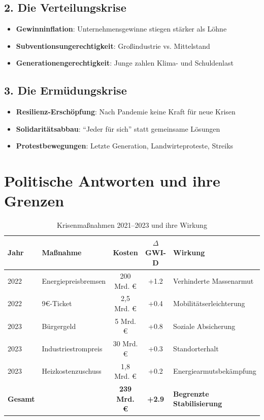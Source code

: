 \subsection{2. Die Verteilungskrise}

\begin{itemize}
    \item \textbf{Gewinninflation}: Unternehmensgewinne stiegen stärker als Löhne
    \item \textbf{Subventionsungerechtigkeit}: Großindustrie vs. Mittelstand
    \item \textbf{Generationengerechtigkeit}: Junge zahlen Klima- und Schuldenlast
\end{itemize}

\subsection{3. Die Ermüdungskrise}

\begin{itemize}
    \item \textbf{Resilienz-Erschöpfung}: Nach Pandemie keine Kraft für neue Krisen
    \item \textbf{Solidaritätsabbau}: \enquote{Jeder für sich} statt gemeinsame Lösungen
    \item \textbf{Protestbewegungen}: Letzte Generation, Landwirteproteste, Streiks
\end{itemize}

\section{Politische Antworten und ihre Grenzen}

\begin{table}[ht]
    \centering
    \caption{Krisenmaßnahmen 2021–2023 und ihre Wirkung}
    \label{tab:massnahmen_multikrise}
    \begin{tabular}{llccp{5cm}}
        \toprule
        \textbf{Jahr} & \textbf{Maßnahme} & \textbf{Kosten} & \textbf{$\Delta$ GWI-D} & \textbf{Wirkung} \\
        \midrule
        2022 & Energiepreisbremsen & 200 Mrd. € & +1.2 & Verhinderte Massenarmut \\
        2022 & 9€-Ticket & 2,5 Mrd. € & +0.4 & Mobilitätserleichterung \\
        2023 & Bürgergeld & 5 Mrd. € & +0.8 & Soziale Absicherung \\
        2023 & Industriestrompreis & 30 Mrd. € & +0.3 & Standorterhalt \\
        2023 & Heizkostenzuschuss & 1,8 Mrd. € & +0.2 & Energiearmutsbekämpfung \\
        \midrule
        \textbf{Gesamt} & & \textbf{239 Mrd. €} & \textbf{+2.9} & \textbf{Begrenzte Stabilisierung} \\
        \bottomrule
    \end{tabular}
\end{table}

